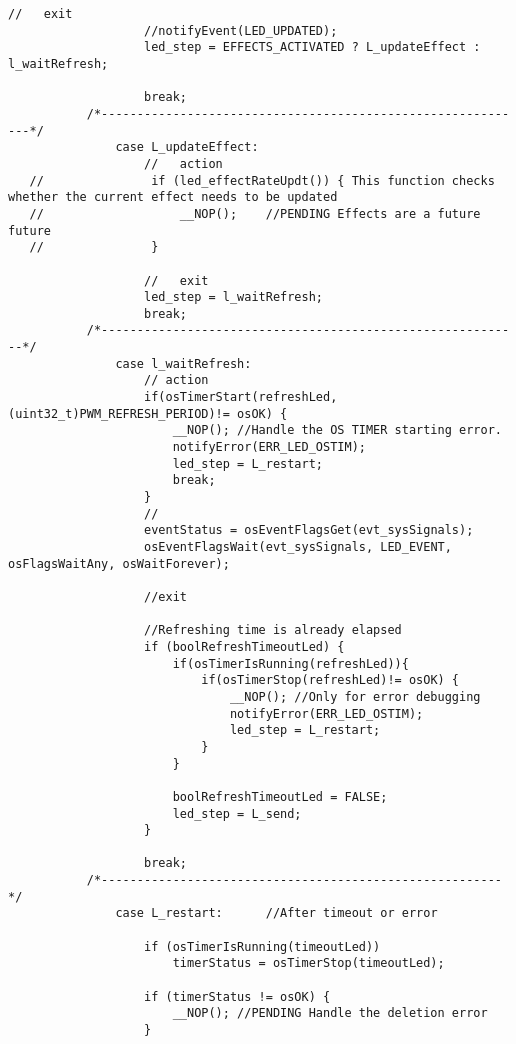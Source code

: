 \begin{lstlisting}[label=lst:led,caption={Main source code for LED DSM.}]
                   //	exit
                   //notifyEvent(LED_UPDATED);
                   led_step = EFFECTS_ACTIVATED ? L_updateEffect : l_waitRefresh;
   
                   break;
           /*------------------------------------------------------------*/
               case	L_updateEffect:
                   //	action
   //				if (led_effectRateUpdt()) {	This function checks whether the current effect needs to be updated
   //					__NOP();	//PENDING Effects are a future future
   //				}
   
                   //	exit
                   led_step = l_waitRefresh;
                   break;
           /*-----------------------------------------------------------*/
               case	l_waitRefresh:
                   // action
                   if(osTimerStart(refreshLed, (uint32_t)PWM_REFRESH_PERIOD)!= osOK) {
                       __NOP(); //Handle the OS TIMER starting error.
                       notifyError(ERR_LED_OSTIM);
                       led_step = L_restart;
                       break;
                   }
                   //
                   eventStatus = osEventFlagsGet(evt_sysSignals);
                   osEventFlagsWait(evt_sysSignals, LED_EVENT, osFlagsWaitAny, osWaitForever);
   
                   //exit
   
                   //Refreshing time is already elapsed
                   if (boolRefreshTimeoutLed) {
                       if(osTimerIsRunning(refreshLed)){
                           if(osTimerStop(refreshLed)!= osOK) {
                               __NOP();	//Only for error debugging
                               notifyError(ERR_LED_OSTIM);
                               led_step = L_restart;
                           }
                       }
   
                       boolRefreshTimeoutLed = FALSE;
                       led_step = L_send;
                   }
   
                   break;
           /*--------------------------------------------------------*/
               case	L_restart:		//After timeout or error
   
                   if (osTimerIsRunning(timeoutLed))
                       timerStatus = osTimerStop(timeoutLed);
   
                   if (timerStatus != osOK) {
                       __NOP(); //PENDING Handle the deletion error
                   }
   

\end{lstlisting}
